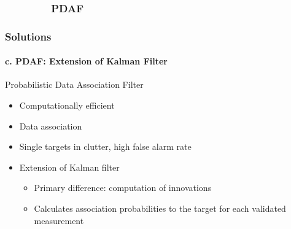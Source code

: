 \documentclass{beamer}
\begin{document}
\subsubsection{\ \ \ \ \ \ \ \ PDAF }
\begin{frame}
\frametitle{Solutions}
\framesubtitle{c. PDAF: Extension of Kalman Filter}
\mypagenum
{\color{red} Probabilistic Data Association Filter}
\begin{itemize}
\item Computationally efficient 
\item Data association
\item Single targets in clutter, high false alarm rate
\item Extension of Kalman filter
\begin{itemize}
\item Primary difference: computation of innovations
\item Calculates association probabilities to the target for each validated measurement
\end{itemize}
\end{itemize}
\end{frame}



\end{document}
